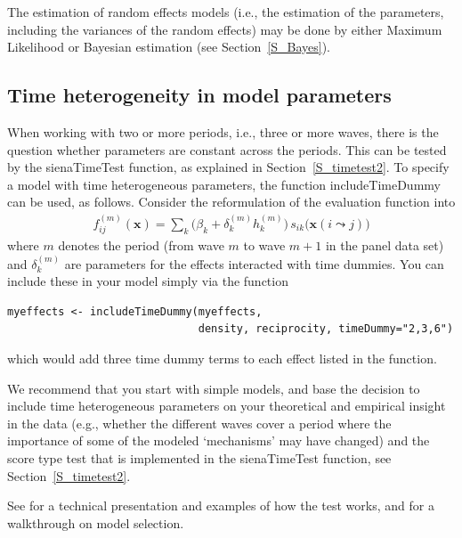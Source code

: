 \documentclass[a4paper,fleqn,11pt]{article}
\newcommand{\+}{\, + \,}
\newcommand{\sfn}[1]{\textsf{#1}}
\begin{document}
The estimation of random effects models
(i.e., the estimation of the parameters,
including the variances of the random effects)
may be done by either Maximum Likelihood
or Bayesian estimation (see Section~\ref{S_Bayes}).

\fi

\subsection{Time heterogeneity in model parameters}
\label{S_timetest1}

When working with two or more periods, i.e., three or more waves,
there is the question whether parameters are constant across the periods.
This can be tested by the \sfn{sienaTimeTest} function, as explained
in Section~\ref{S_timetest2}.
To specify a model with time heterogeneous parameters, the function
\sfn{includeTimeDummy} can be used, as follows.
Consider the reformulation of the evaluation function into
\begin{align}
f^{(m)}_{ij}(\mathbf{x})= \sum_k \Big(\beta_k + \delta_k^{(m)} h_k^{(m)}\Big)
                              \,      s_{ik}\big(\mathbf{x}(i \leadsto j)\big)
\label{eq:fmij}
\end{align}
where $m$ denotes the period (from wave $m$ to wave $m+1$
in the panel data set)
and $\delta_k^{(m)}$ are parameters for the effects interacted
with time dummies. You
can include these in your model simply via the function
\begin{verbatim}
myeffects <- includeTimeDummy(myeffects,
                              density, reciprocity, timeDummy="2,3,6")
\end{verbatim}
which would add three time dummy terms to each effect listed in the function.

We recommend that you start with simple models,
and base the decision to include time heterogeneous parameters
on your theoretical and empirical insight in the data
(e.g., whether the different waves cover a period where the importance
of some of the modeled `mechanisms' may have changed) and
the score type test that is implemented in the \sfn{sienaTimeTest} function,
see Section~\ref{S_timetest2}.

See \citet{Lospinoso2011} for a technical presentation
and examples of how the test works,
and \citet{Lospinoso2010b} for a walkthrough on model selection.
\end{document}

